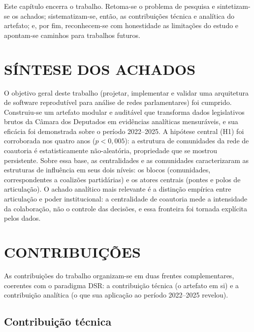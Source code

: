 \documentclass[
      12pt,
      a4paper,
      openright,
      oneside,
      chapter=TITLE,
      section=TITLE,
      english,
      french,
      spanish,
      brazilian
    ]{abntex2}
\begin{document}
    Este capítulo encerra o trabalho. Retoma-se o problema de pesquisa e sintetizam-se os achados; sistematizam-se, então, as contribuições técnica e analítica do artefato; e, por fim, reconhecem-se com honestidade as limitações do estudo e apontam-se caminhos para trabalhos futuros.

    \section{SÍNTESE DOS ACHADOS}
    
    O objetivo geral deste trabalho (projetar, implementar e validar uma arquitetura de software reprodutível para análise de redes parlamentares) foi cumprido. Construiu-se um artefato modular e auditável que transforma dados legislativos brutos da Câmara dos Deputados em evidências analíticas mensuráveis, e sua eficácia foi demonstrada sobre o período 2022--2025. A hipótese central (H1) foi corroborada nos quatro anos ($p<0{,}005$): a estrutura de comunidades da rede de coautoria é estatisticamente não-aleatória, propriedade que se mostrou persistente. Sobre essa base, as centralidades e as comunidades caracterizaram as estruturas de influência em seus dois níveis: os blocos (comunidades, correspondentes a coalizões partidárias) e os atores centrais (pontes e polos de articulação). O achado analítico mais relevante é a distinção empírica entre articulação e poder institucional: a centralidade de coautoria mede a intensidade da colaboração, não o controle das decisões, e essa fronteira foi tornada explícita pelos dados.
    
    \section{CONTRIBUIÇÕES}

    As contribuições do trabalho organizam-se em duas frentes complementares, coerentes com o paradigma DSR: a contribuição técnica (o artefato em si) e a contribuição analítica (o que sua aplicação ao período 2022--2025 revelou).

    \subsection{Contribuição técnica}
    
\end{document}

